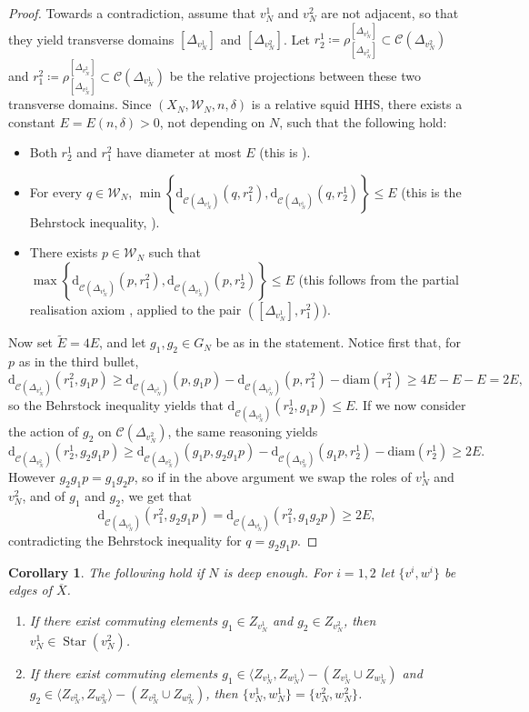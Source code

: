\documentclass[svgnames]{amsart}
\theoremstyle{plain}
\newtheorem{cor}[thm]{Corollary}
\theoremstyle{definition}
\newcommand{\C}[1]{\mathcal{C}(#1)}
\newcommand{\dist}{\mathrm{d}}
\newcommand{\diam}{\mathrm{diam}}
\newcommand{\W}{\mathcal{W}}
\newcommand{\CStar}[1]{\operatorname{Star}\left(#1\right)}
\newcommand{\squid}[1]{squid}
\newcommand{\ov}[1]{\overline{#1}}
\begin{document}
\begin{proof}
Towards a contradiction, assume that $v^1_N$ and $v^2_N$ are not adjacent, so that they yield transverse domains $[\Delta_{v^1_N}]$ and $[\Delta_{v^2_N}]$. Let $r^1_2\coloneq \rho^{[\Delta_{v^1_N}]}_{[\Delta_{v^2_N}]}\subset \C{\Delta_{v^2_N}}$ and $r^2_1\coloneq \rho^{[\Delta_{v^2_N}]}_{[\Delta_{v^1_N}]}\subset \C{\Delta_{v^1_N}}$ be the relative projections between these two transverse domains. Since $(X_N,\W_N,n,\delta)$ is a relative \squid{} HHS, there exists a constant $E=E(n,\delta)>0$, not depending on $N$, such that the following hold:
\begin{itemize}
    \item Both $r^1_2$ and $r^2_1$ have diameter at most $E$ (this is \cite[Definition 1.14.(1)]{HHS_II}).
    \item For every $q\in \W_N$, $\min\left\{\dist_{\C{\Delta_{v^1_N}}}(q,r^2_1), \dist_{\C{\Delta_{v^1_N}}}(q,r^1_2)\right\}\le E$ (this is the Behrstock inequality, \cite[Definition 1.14.(4)]{HHS_II}).
    \item There exists $p\in \W_N$ such that $\max\left\{\dist_{\C{\Delta_{v^1_N}}}(p,r^2_1), \dist_{\C{\Delta_{v^1_N}}}(p,r^1_2)\right\}\le E$ (this follows from the partial realisation axiom \cite[Definition 1.14.(8)]{HHS_II}, applied to the pair $([\Delta_{v^1_N}],r^2_1)$).
\end{itemize}
Now set $\widetilde E=4E$, and let $g_1,g_2\in G_N$ be as in the statement. Notice first that, for $p$ as in the third bullet,
$$\dist_{\C{\Delta_{v^1_N}}}(r^2_1,g_1p)\ge \dist_{\C{\Delta_{v^1_N}}}(p,g_1 p)-\dist_{\C{\Delta_{v^1_N}}}(p,r^2_1)-\diam(r^2_1)\ge 4E-E-E=2E,$$
so the Behrstock inequality yields that $\dist_{\C{\Delta_{v^2_N}}}(r^1_2,g_1 p)\le E$. If we now consider the action of $g_2 $ on $\C{\Delta_{v^2_N}}$, the same reasoning yields 
$$\dist_{\C{\Delta_{v^2_N}}}(r^1_2,g_2 g_1 p)\ge \dist_{\C{\Delta_{v^2_N}}}(g_1 p,g_2 g_1 p)-\dist_{\C{\Delta_{v^2_N}}}(g_1 p,r^1_2)-\diam(r^1_2)\ge 2E.$$
However $g_2 g_1 p=g_1 g_2 p$, so if in the above argument we swap the roles of $v^1_N$ and $v^2_N$, and of $g_1 $ and $g_2 $, we get that $$\dist_{\C{\Delta_{v^1_N}}}(r^2_1,g_2 g_1 p)=\dist_{\C{\Delta_{v^1_N}}}(r^2_1,g_1 g_2 p)\ge 2E,$$ contradicting the Behrstock inequality for $q=g_2 g_1 p$.
\end{proof}

\begin{cor}\label{cor:commuting_multitwist}
    The following hold if $N$ is deep enough. For $i=1,2$ let $\{v^i,w^i\}$ be edges of $\ov X$.
    \begin{enumerate}
        \item \label{item_comm_mult1} If there exist commuting elements $g_1\in Z_{v^1_N}$ and $g_2\in Z_{v^2_N}$, then $v^1_N\in \CStar{v^2_N}$.
        \item \label{item_comm_mult2} If there exist commuting elements $g_1\in \langle Z_{v^1_N}, Z_{w^1_N}\rangle-(Z_{v^1_N}\cup Z_{w^1_N})$ and $g_2\in \langle Z_{v^2_N}, Z_{w^2_N}\rangle-(Z_{v^2_N}\cup Z_{w^2_N})$, then $\{v^1_N,w^1_N\}=\{v^2_N,w^2_N\}$.
    \end{enumerate}
\end{cor}
\end{document}
